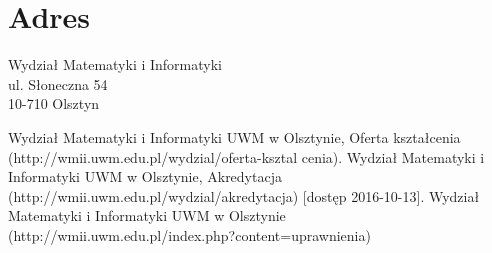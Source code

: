 ﻿\documentclass[a4paper,12pt]{article}
\begin{document}
\section{Adres}
\begin{center}
Wydział Matematyki i Informatyki\\
ul. Słoneczna 54\\
10-710 Olsztyn	
\end{center}


\begin{thebibliography}{1}
 Wydział Matematyki i Informatyki UWM w Olsztynie, Oferta kształcenia (http://wmii.uwm.edu.pl/wydzial/oferta-ksztal
cenia)\newline [dostęp 2016-10-12].
 Wydział Matematyki i Informatyki UWM w Olsztynie, Akredytacja (http://wmii.uwm.edu.pl/wydzial/akredytacja) [dostęp 2016-10-13].
 Wydział Matematyki i Informatyki UWM w Olsztynie (http://wmii.uwm.edu.pl/index.php?content=uprawnienia)
\end{thebibliography}
\end{document}
